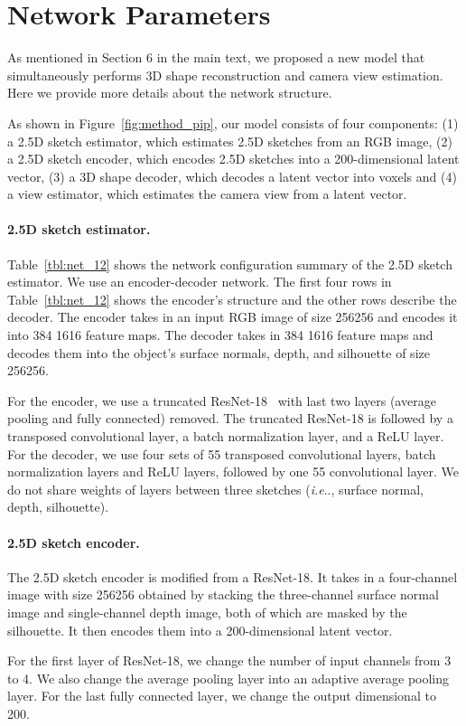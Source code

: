\documentclass[10pt,twocolumn,letterpaper]{article}
\makeatletter
\newcommand{\fig}[1]{Figure~\ref{#1}}
\newcommand{\tbl}[1]{Table~\ref{#1}}
\DeclareRobustCommand\onedot{\futurelet\@let@token\@onedot}
\def\@onedot{\ifx\@let@token.\else.\null\fi\xspace}
\def\ie{\emph{i.e}\onedot} \def\Ie{\emph{I.e}\onedot}
\newcommand{\myparagraph}[1]{\vspace{-14pt}\paragraph{#1}}
\makeatother
\begin{document}
\section{Network Parameters}
\label{sec:net_para}

As mentioned in Section 6 in the main text, we proposed a new model that simultaneously performs 3D shape reconstruction and camera view estimation. Here we provide more details about the network structure.

As shown in \fig{fig:method_pip}, our model consists of four components: (1) a 2.5D sketch estimator, which estimates 2.5D sketches from an RGB image, (2) a 2.5D sketch encoder, which encodes 2.5D sketches into a 200-dimensional latent vector, (3) a 3D shape decoder, which decodes a latent vector into voxels and (4) a view estimator, which estimates the camera view from a latent vector.

\myparagraph{2.5D sketch estimator. }
\tbl{tbl:net_12} shows the network configuration summary of the 2.5D sketch estimator. We use an encoder-decoder network. The first four rows in \tbl{tbl:net_12} shows the encoder's structure and the other rows describe the decoder. The encoder takes in an input RGB image of size 256256 and encodes it into 384 1616 feature maps. The decoder takes in 384 1616 feature maps and decodes them into the object's surface normals, depth, and silhouette of size 256256.

For the encoder, we use a truncated ResNet-18~\cite{He2015Deep} with last two layers (average pooling and fully connected) removed. The truncated ResNet-18 is followed by a transposed convolutional layer, a batch normalization layer, and a ReLU layer. For the decoder, we use four sets of 55 transposed convolutional layers, batch normalization layers and ReLU layers, followed by one 55 convolutional layer. We do not share weights of layers between three sketches (\ie, surface normal, depth, silhouette).

\myparagraph{2.5D sketch encoder. }
The 2.5D sketch encoder is modified from a ResNet-18. It takes in a four-channel image with size 256256 obtained by stacking the three-channel surface normal image and single-channel depth image, both of which are masked by the silhouette. It then encodes them into a 200-dimensional latent vector.

For the first layer of ResNet-18, we change the number of input channels from 3 to 4. We also change the average pooling layer into an adaptive average pooling layer. For the last fully connected layer, we change the output dimensional to 200.
\end{document}
